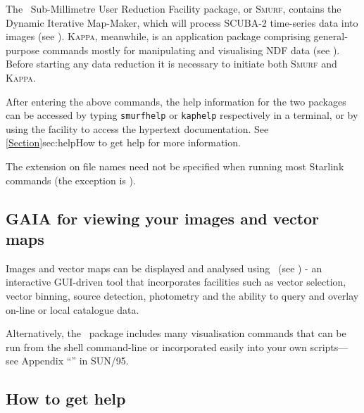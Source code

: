 The \starlink\ Sub-Millimetre User Reduction Facility package, or \textsc{Smurf},
contains the Dynamic Iterative Map-Maker, which will process
SCUBA-2 time-series data into images (see \smurfsun). \textsc{Kappa}, meanwhile, is
an application package comprising general-purpose commands mostly for
manipulating and visualising NDF data (see \kappasun). Before starting
any data reduction it is necessary to initiate both \textsc{Smurf} and
\textsc{Kappa}.

\begin{terminalv}
\end{terminalv}

After entering the above commands, the help information
for the two packages can be accessed by typing \texttt{smurfhelp} or
\texttt{kaphelp} respectively in a terminal, or by using the
 facility to access the hypertext documentation. See
\cref{Section}{sec:help}{How to get help} for more information.



\begin{tip}
The  extension on file names need not be specified when running most
Starlink commands (the exception is \picard).
\end{tip}


\subsection{GAIA for viewing your images and vector maps}
Images and vector maps can be displayed and analysed using \gaia\ (see
\gaiasun) - an interactive GUI-driven tool that incorporates facilities
such as vector selection, vector binning, source detection, photometry
and the ability to query and overlay on-line or local catalogue data.
\begin{terminalv}
\end{terminalv}

Alternatively, the \Kappa\ package includes many visualisation commands
that can be run from the shell command-line or incorporated easily into your
own scripts---see Appendix ``''
in SUN/95.


\subsection{How to get help}
\label{sec:help}

